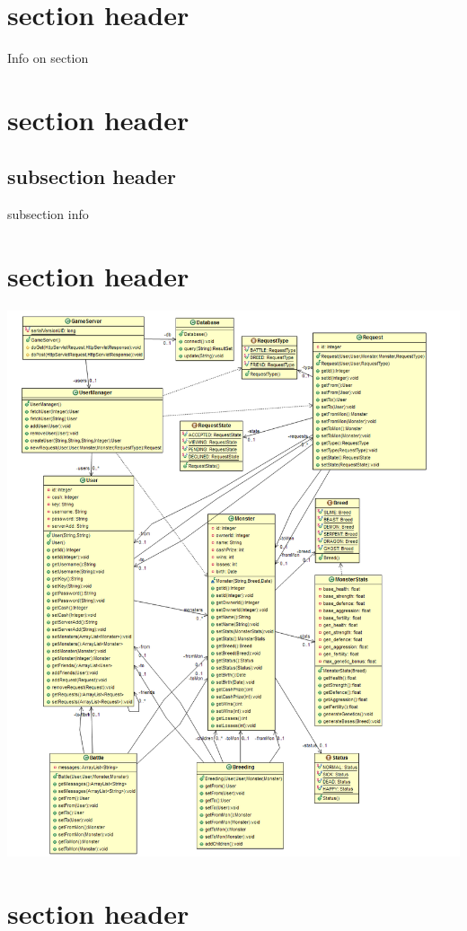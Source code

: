 \documentclass{project}
\begin{document}
\section{section header}
Info on section
\section{section header}


\subsection{subsection header}
subsection info

\section{section header}
\includegraphics[scale=0.40]{MonsterDiagram.png}

\section{section header}
\end{document}

